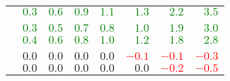 \begin{table}[htpb]
\begin{tabular}{lrrrrrrr}
    \usruleTwin{}               & \textcolor{Green}{$0.3$} & \textcolor{Green}{$0.6$} & \textcolor{Green}{$0.9$} & \textcolor{Green}{$1.1$} & \textcolor{Green}{$1.3$} & \textcolor{Green}{$2.2$} & \textcolor{Green}{$3.5$} \\
    \multicolumn{8}{c}{\epi{}} \\
    \uslpropGsecTwin{}          & \textcolor{Green}{$0.3$} & \textcolor{Green}{$0.5$} & \textcolor{Green}{$0.7$} & \textcolor{Green}{$0.8$} & \textcolor{Green}{$1.0$} & \textcolor{Green}{$1.9$} & \textcolor{Green}{$3.0$} \\
    \usruleTwin{}               & \textcolor{Green}{$0.4$} & \textcolor{Green}{$0.6$} & \textcolor{Green}{$0.8$} & \textcolor{Green}{$1.0$} & \textcolor{Green}{$1.2$} & \textcolor{Green}{$1.8$} & \textcolor{Green}{$2.8$} \\
    \multicolumn{8}{c}{\kiw{}} \\
    \uslpropGsecTwin{}          & $0.0$                    & $0.0$                    & $0.0$                    & $0.0$                    & \textcolor{Red}{$-0.1$}  & \textcolor{Red}{$-0.1$}  & \textcolor{Red}{$-0.3$}  \\
    \usruleTwin{}               & $0.0$                    & $0.0$                    & $0.0$                    & $0.0$                    & $0.0$                    & \textcolor{Red}{$-0.2$}  & \textcolor{Red}{$-0.5$}  \\
    \bottomrule
  \end{tabular}
\end{table}
